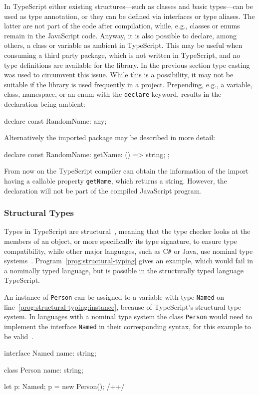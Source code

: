In TypeScript either existing structures---such as classes and basic types---can be used as type annotation, or they can be defined via interfaces or type aliases. The latter are not part of the code after compilation, while, e.g., classes or enums remain in the JavaScript code. Anyway, it is also possible to declare, among others, a class or variable as ambient in TypeScript. This may be useful when consuming a third party package, which is not written in TypeScript, and no type definitions are available for the library. In the previous section type casting was used to circumvent this issue. While this is a possibility, it may not be suitable if the library is used frequently in a project. Prepending, e.g., a variable, class, namespace, or an enum with the \texttt{declare} keyword, results in the declaration being ambient:
\begin{JsCode}[numbers=none]
declare const RandomName: any;
\end{JsCode}
Alternatively the imported package may be described in more detail:
\begin{JsCode}[numbers=none]
declare const RandomName: {
  getName: () => string;
};
\end{JsCode}
From now on the TypeScript compiler can obtain the information of the import having a callable property \texttt{getName}, which returns a string. However, the declaration will not be part of the compiled JavaScript program.

\subsubsection{Structural Types}
\label{sec:ts-structural-types}

Types in TypeScript are structural~\cite[p.~11]{TypeScriptBook:Syed:2017}, meaning that the type checker looks at the members of an object, or more specifically its type signature, to ensure type compatibility, while other major languages, such as C\texttt{\#} or Java, use nominal type systems~\cite{TypeScriptHandbook:TypeCompatibility}. Program~\ref{prog:structural-typing} gives an example, which would fail in a nominally typed language, but is possible in the structurally typed language TypeScript.

\begin{program}
\caption{An instance of \texttt{Person} can be assigned to a variable with type \texttt{Named} on line~\ref{prog:structural-typing:instance}, because of TypeScript's structural type system. In languages with a nominal type system the class \texttt{Person} would need to implement the interface \texttt{Named} in their corresponding syntax, for this example to be valid~\cite{TypeScriptHandbook:TypeCompatibility}.}
\label{prog:structural-typing}
\begin{JsCode}
interface Named {
    name: string;
}

class Person {
    name: string;
}

let p: Named;
p = new Person(); /+\label{prog:structural-typing:instance}+/
\end{JsCode}
\end{program}

